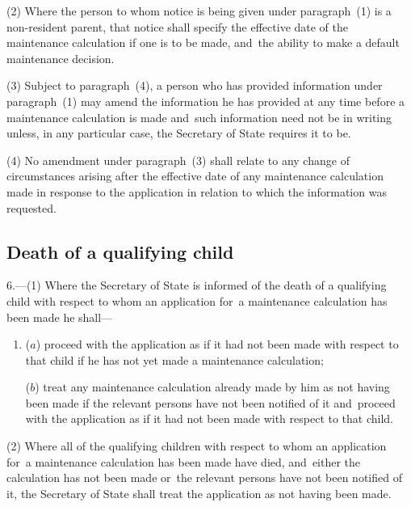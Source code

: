 \documentclass[12pt,a4paper]{article}
\begin{document}
(2) Where the person to whom notice is being given under paragraph~(1) is a non-resident parent, that notice shall specify the effective date of the maintenance calculation if one is to be made, and~the ability to make a default maintenance decision.

(3) Subject to paragraph~(4), a person who has provided information under paragraph~(1) may amend the information he has provided at any time before a maintenance calculation is made and~such information need not be in writing unless, in any particular case, the Secretary of State requires it to be.

(4) No amendment under paragraph~(3) shall relate to any change of circumstances arising after the effective date of any maintenance calculation made in response to the application in relation to which the information was requested.


\subsection[6. Death of a qualifying child]{Death of a qualifying child}

6.---(1)  Where the Secretary of State is informed of the death of a qualifying child with respect to whom an application for~a maintenance calculation has been made 
he shall—
\begin{enumerate}\item[]
($a$) proceed with the application as if it had not been made with respect to that child if he has not yet made a maintenance calculation;

($b$) treat any maintenance calculation already made by him as not having been made if the relevant persons have not been notified of it and~proceed with the application as if it had not been made with respect to that child.
\end{enumerate}

(2) Where all of the qualifying children with respect to whom an application for~a maintenance calculation has been made have died, and~either the calculation has not been made or~the relevant persons have not been notified of it, the Secretary of State shall treat the application as not having been made.
\end{document}
